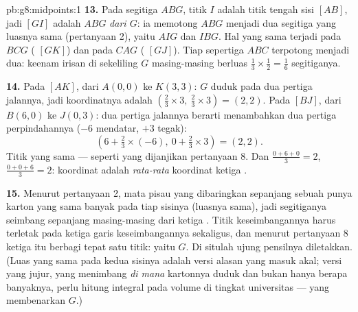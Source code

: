 \begin{solution}{pb:g8:midpoints:1}
\textbf{13.} Pada segitiga $ABG$, titik $I$ adalah titik tengah
sisi $[AB]$, jadi $[GI]$ adalah  $ABG$ \emph{dari  $G$}: ia memotong $ABG$ menjadi dua segitiga yang luasnya sama
(pertanyaan 2), yaitu $AIG$ dan $IBG$. Hal yang sama terjadi pada
$BCG$ ( $[GK]$) dan pada $CAG$ ( $[GJ]$). Tiap
sepertiga $ABC$ terpotong menjadi dua: keenam irisan di sekeliling
$G$ masing-masing berluas
$\frac13 \times \frac12 = \frac16$ segitiganya.

\textbf{14.} Pada  $[AK]$, dari $A(0,0)$ ke $K(3,3)$: $G$
duduk pada dua pertiga jalannya, jadi koordinatnya adalah
$\left(\frac23 \times 3,\ \frac23 \times 3\right) = (2, 2)$. Pada
 $[BJ]$, dari $B(6, 0)$ ke $J(0, 3)$: dua pertiga
jalannya berarti menambahkan dua pertiga perpindahannya ($-6$
mendatar, $+3$ tegak):
\[
\left(6 + \tfrac23 \times (-6),\ 0 + \tfrac23 \times 3\right)
= (2, 2) .
\]
Titik yang sama --- seperti yang dijanjikan pertanyaan 8. Dan
$\frac{0 + 6 + 0}{3} = 2$, $\frac{0 + 0 + 6}{3} = 2$: koordinat  adalah \emph{rata-rata} koordinat ketiga
.

\textbf{15.} Menurut pertanyaan 2, mata pisau yang dibaringkan
sepanjang sebuah  punya karton yang sama banyak pada tiap
sisinya (luasnya sama), jadi segitiganya seimbang sepanjang
masing-masing dari ketiga . Titik keseimbangannya harus
terletak pada ketiga garis keseimbangannya sekaligus, dan menurut
pertanyaan 8 ketiga  itu berbagi tepat satu titik:
yaitu $G$. Di situlah ujung pensilnya diletakkan. (Luas yang sama pada
kedua sisinya adalah versi alasan yang masuk akal; versi yang jujur,
yang menimbang \emph{di mana} kartonnya duduk dan bukan hanya berapa
banyaknya, perlu hitung integral pada volume di tingkat universitas
--- yang membenarkan $G$.)

\end{solution}
